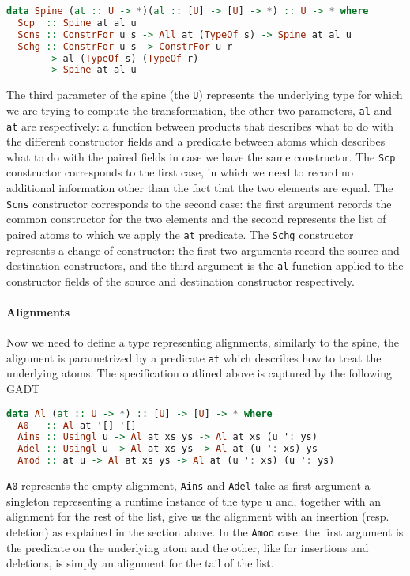 \documentclass[11pt]{article}
\begin{document}
\begin{lstlisting}[language=haskell]
data Spine (at :: U -> *)(al :: [U] -> [U] -> *) :: U -> * where
  Scp  :: Spine at al u
  Scns :: ConstrFor u s -> All at (TypeOf s) -> Spine at al u
  Schg :: ConstrFor u s -> ConstrFor u r
       -> al (TypeOf s) (TypeOf r)
       -> Spine at al u
\end{lstlisting}

The third parameter of the spine (the \texttt{U}) represents the
underlying type for which we are trying to compute the transformation,
the other two parameters, \texttt{al} and \texttt{at} are respectively: a
function between products that describes what to do with the different
constructor fields and a predicate between atoms which describes what to
do with the paired fields in case we have the same constructor. The
\texttt{Scp} constructor corresponds to the first case, in which we need
to record no additional information other than the fact that the two
elements are equal. The \texttt{Scns} constructor corresponds to the
second case: the first argument records the common constructor for the
two elements and the second represents the list of paired atoms to which
we apply the \texttt{at} predicate. The \texttt{Schg} constructor
represents a change of constructor: the first two arguments record the
source and destination constructors, and the third argument is the
\texttt{al} function applied to the constructor fields of the source and
destination constructor respectively.

\paragraph{Alignments}\label{alignments}

Now we need to define a type representing alignments, similarly to the
spine, the alignment is parametrized by a predicate \texttt{at} which
describes how to treat the underlying atoms. The specification outlined
above is captured by the following GADT

\begin{lstlisting}[language=haskell]
data Al (at :: U -> *) :: [U] -> [U] -> * where
  A0   :: Al at '[] '[]
  Ains :: Usingl u -> Al at xs ys -> Al at xs (u ': ys)
  Adel :: Usingl u -> Al at xs ys -> Al at (u ': xs) ys
  Amod :: at u -> Al at xs ys -> Al at (u ': xs) (u ': ys)
\end{lstlisting}

\texttt{A0} represents the empty alignment, \texttt{Ains} and \texttt{Adel} take as first argument
a singleton representing a runtime instance of the type u and, together
with an alignment for the rest of the list, give us the alignment with
an insertion (resp. deletion) as explained in the section above. In the
\texttt{Amod} case: the first argument is the predicate on the underlying atom
and the other, like for insertions and deletions, is simply an alignment for the tail of the 
list.
\end{document}
